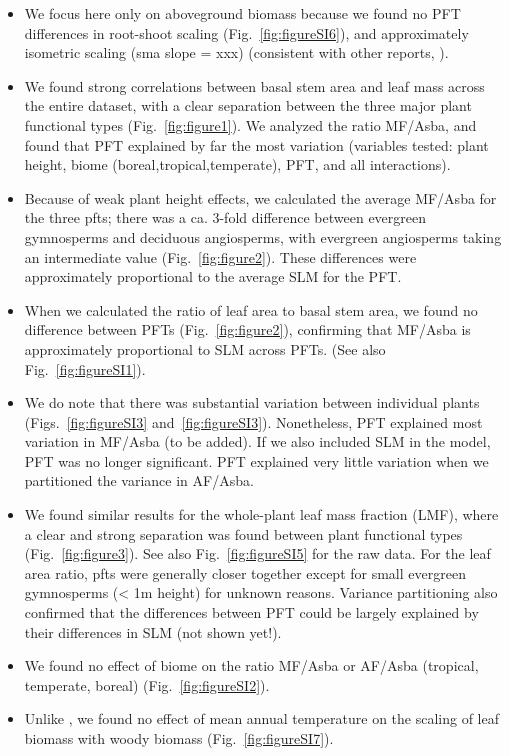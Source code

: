 \documentclass[a4paper]{article}
\begin{document}
\begin{itemize}

\item We focus here only on aboveground biomass because we found no PFT differences in root-shoot scaling (Fig.~\ref{fig:figureSI6}), and approximately isometric scaling (sma slope = xxx) (consistent with other reports, \cite{hui_near_2014, cairns_root_1997}).

\item We found strong correlations between basal stem area and leaf mass across the entire dataset, with a clear separation between the three major plant functional types (Fig.~\ref{fig:figure1}). We analyzed the ratio MF/Asba, and found that PFT explained by far the most variation (variables tested: plant height, biome (boreal,tropical,temperate), PFT, and all interactions).

\item Because of weak plant height effects, we calculated the average MF/Asba for the three pfts; there was a ca. 3-fold difference between evergreen gymnosperms and deciduous angiosperms, with evergreen angiosperms taking an intermediate value (Fig.~\ref{fig:figure2}). These differences were approximately proportional to the average SLM for the PFT. 

\item When we calculated the ratio of leaf area to basal stem area, we found no difference between PFTs (Fig.~\ref{fig:figure2}), confirming that MF/Asba is approximately proportional to SLM across PFTs. (See also Fig.~\ref{fig:figureSI1}).

\item We do note that there was substantial variation between individual plants (Figs.~\ref{fig:figureSI3} and~\ref{fig:figureSI3}). Nonetheless, PFT explained most variation in MF/Asba (to be added). If we also included SLM in the model, PFT was no longer significant. PFT explained very little variation when we partitioned the variance in AF/Asba.

\item We found similar results for the whole-plant leaf mass fraction (LMF), where a clear and strong separation was found between plant functional types (Fig.~\ref{fig:figure3}). See also Fig.~\ref{fig:figureSI5} for the raw data. For the leaf area ratio, pfts were generally closer together except for small evergreen gymnosperms (< 1m height) for unknown reasons. Variance partitioning also confirmed that the differences between PFT could be largely explained by their differences in SLM (not shown yet!).

\item We found no effect of biome on the ratio MF/Asba or AF/Asba (tropical, temperate, boreal) (Fig.~\ref{fig:figureSI2}). 

\item Unlike \cite{reich_temperature_2014}, we found no effect of mean annual temperature on the scaling of leaf biomass with woody biomass (Fig.~\ref{fig:figureSI7}).


\end{itemize}
\end{document}
